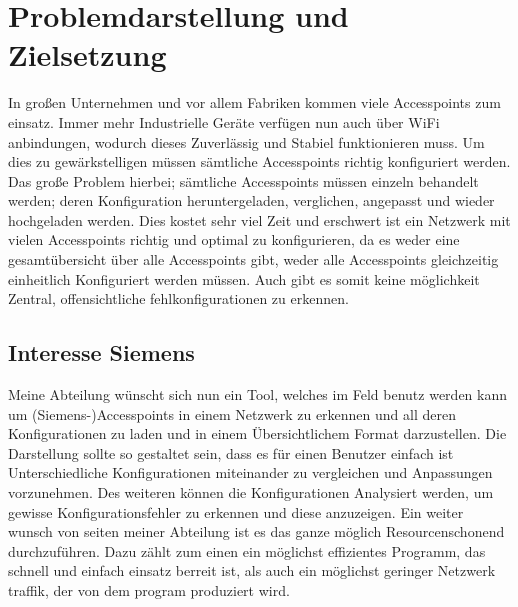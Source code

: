 \section{Problemdarstellung und Zielsetzung}
In großen Unternehmen und vor allem Fabriken kommen viele Accesspoints zum einsatz.
Immer mehr Industrielle Geräte verfügen nun auch über WiFi anbindungen, wodurch dieses Zuverlässig und Stabiel funktionieren muss.
Um dies zu gewärkstelligen müssen sämtliche Accesspoints richtig konfiguriert werden.
Das große Problem hierbei; sämtliche Accesspoints müssen einzeln behandelt werden; deren Konfiguration heruntergeladen, verglichen, angepasst und wieder hochgeladen werden.
Dies kostet sehr viel Zeit und erschwert ist ein Netzwerk mit vielen Accesspoints richtig und optimal zu konfigurieren, da es weder eine gesamtübersicht über alle Accesspoints gibt, weder alle Accesspoints gleichzeitig einheitlich Konfiguriert werden müssen.
Auch gibt es somit keine möglichkeit Zentral, offensichtliche fehlkonfigurationen zu erkennen.
\subsection{Interesse Siemens}
Meine Abteilung wünscht sich nun ein Tool, welches im Feld benutz werden kann um (Siemens-)Accesspoints in einem Netzwerk zu erkennen und all deren Konfigurationen zu laden und in einem Übersichtlichem Format darzustellen.
Die Darstellung sollte so gestaltet sein, dass es für einen Benutzer einfach ist Unterschiedliche Konfigurationen miteinander zu vergleichen und Anpassungen vorzunehmen.
Des weiteren können die Konfigurationen Analysiert werden, um gewisse Konfigurationsfehler zu erkennen und diese anzuzeigen.
Ein weiter wunsch von seiten meiner Abteilung ist es das ganze möglich Resourcenschonend durchzuführen.
Dazu zählt zum einen ein möglichst effizientes Programm, das schnell und einfach einsatz berreit ist, als auch ein möglichst geringer Netzwerk traffik, der von dem program produziert wird.
